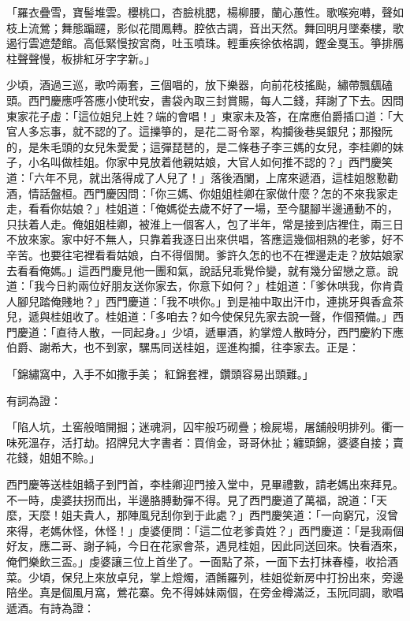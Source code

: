 「羅衣疊雪，寶髻堆雲。櫻桃口，杏臉桃腮，楊柳腰，蘭心蕙性。歌喉宛囀，聲如枝上流鶯；舞態蹁躚，影似花間鳳轉。腔依古調，音出天然。舞回明月墜秦樓，歌遏行雲遮楚館。高低緊慢按宮商，吐玉噴珠。輕重疾徐依格調，鏗金戛玉。箏排鴈柱聲聲慢，板排紅牙字字新。」

少頃，酒過三巡，歌吟兩套，三個唱的，放下樂器，向前花枝搖颭，繡帶飄颻磕頭。西門慶應呼答應小使玳安，書袋內取三封賞賜，每人二錢，拜謝了下去。因問東家花子虛：「這位姐兒上姓？端的會唱！」東家未及答，在席應伯爵插口道：「大官人多忘事，就不認的了。這擽箏的，是花二哥令翠，构攔後巷吳銀兒；那撥阮的，是朱毛頭的女兒朱愛愛；這彈琵琶的，是二條巷子李三媽的女兒，李桂卿的妹子，小名叫做桂姐。你家中見放着他親姑娘，大官人如何推不認的？」西門慶笑道：「六年不見，就出落得成了人兒了！」落後酒闌，上席來遞酒，這桂姐慇懃勸酒，情話盤桓。西門慶因問：「你三媽、你姐姐桂卿在家做什麼？怎的不來我家走走，看看你姑娘？」桂姐道：「俺媽從去歲不好了一場，至今腿腳半邊通動不的，只扶着人走。俺姐姐桂卿，被淮上一個客人，包了半年，常是接到店裡住，兩三日不放來家。家中好不無人，只靠着我逐日出來供唱，答應這幾個相熟的老爹，好不辛苦。也要往宅裡看看姑娘，白不得個閒。爹許久怎的也不在裡邊走走？放姑娘家去看看俺媽。」這西門慶見他一團和氣，說話兒乖覺伶變，就有幾分留戀之意。說道：「我今日約兩位好朋友送你家去，你意下如何？」桂姐道：「爹休哄我，你肯貴人腳兒踏俺賤地？」西門慶道：「我不哄你。」到是袖中取出汗巾，連挑牙與香盒茶兒，遞與桂姐收了。桂姐道：「多咱去？如今使保兒先家去說一聲，作個預備。」西門慶道：「直待人散，一同起身。」少頃，遞畢酒，約掌燈人散時分，西門慶約下應伯爵、謝希大，也不到家，騾馬同送桂姐，逕進构攔，往李家去。正是：

「錦繡窩中，入手不如撒手美；  紅錦套裡，鑽頭容易出頭難。」

有詞為證：

「陷人坑，土窖般暗開掘；迷魂洞，囚牢般巧砌疊；檢屍場，屠舖般明排列。衢一味死溫存，活打劫。招牌兒大字書者：買俏金，哥哥休扯；纏頭錦，婆婆自接；賣花錢，姐姐不賒。」

西門慶等送桂姐轎子到門首，李桂卿迎門接入堂中，見畢禮數，請老媽出來拜見。不一時，虔婆扶拐而出，半邊胳膊動彈不得。見了西門慶道了萬福，說道：「天麼，天麼！姐夫貴人，那陣風兒刮你到于此處？」西門慶笑道：「一向窮冗，沒曾來得，老媽休怪，休怪！」虔婆便問：「這二位老爹貴姓？」西門慶道：「是我兩個好友，應二哥、謝子純，今日在花家會茶，遇見桂姐，因此同送回來。快看酒來，俺們樂飲三盃。」虔婆讓三位上首坐了。一面點了茶，一面下去打抹春檯，收拾酒菜。少頃，保兒上來放卓兒，掌上燈燭，酒餚羅列，桂姐從新房中打扮出來，旁邊陪坐。真是個風月窩，鶯花寨。免不得姊妹兩個，在旁金樽滿泛，玉阮同調，歌唱遞酒。有詩為證：


